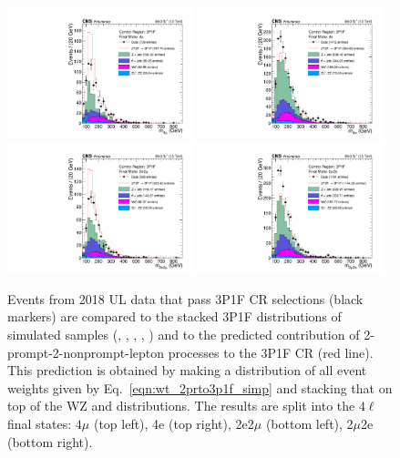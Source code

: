 \begin{figure}[!htbp]
	\begin{center}
		\includegraphics[width=0.48\textwidth]{figures/higgsmassmeas/redbkg/cr/UL2018_CR_3P1F_4mu.pdf}
		\includegraphics[width=0.48\textwidth]{figures/higgsmassmeas/redbkg/cr/UL2018_CR_3P1F_4e.pdf}
		\includegraphics[width=0.48\textwidth]{figures/higgsmassmeas/redbkg/cr/UL2018_CR_3P1F_2e2mu.pdf}
		\includegraphics[width=0.48\textwidth]{figures/higgsmassmeas/redbkg/cr/UL2018_CR_3P1F_2mu2e.pdf}
		\caption{
			Events from 2018 UL data that pass 3P1F CR selections (black markers) 
			are compared to the stacked 3P1F distributions of simulated samples
			(\Zplusjets, \ttbarplusjets, \WZ, \ZZ, \Zgammastar)
			and to the predicted contribution of 2-prompt-2-nonprompt-lepton processes to the 3P1F CR (red line).
			This prediction is obtained by making a distribution of all event weights given by Eq.~\ref{eqn:wt_2prto3p1f_simp} and stacking that on top of the WZ and \ZZ distributions.
			The results are split into the $4\ell$ final states:
			$4\mu$ (top left), 4e (top right), 2e2$\mu$ (bottom left), 2$\mu$2e (bottom right).
		}
		\label{cr_plots_3p1f_2018}
	\end{center}
\end{figure}

